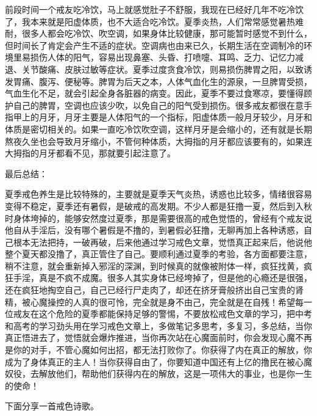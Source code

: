 前段时间一个戒友吃冷饮，马上就感觉肚子不舒服，我现在已经好几年不吃冷饮了，我本来就是阳虚体质，也不大适合吃冷饮。夏季炎热，人们常常感觉暑热难耐，很多人都会吃冷饮、吹空调，如果身体比较健康，那可能暂时感觉不到什么，但时间长了肯定会产生不适的症状。空调病也由来已久，长期生活在空调制冷的环境里易损伤人体的阳气，容易出现鼻塞、头昏、打喷嚏、耳鸣、乏力、记忆力减退、关节酸痛、皮肤过敏等症状。夏季过度贪食冷饮，则易损伤脾胃之阳，以致诱发胃痛、腹泻、便秘等。脾胃为后天之本，人体气血化生的源泉，一旦脾胃受损，气血生化不足，就会引起全身各脏器的病变。因此，夏季不要过食寒凉，要懂得顾护自己的脾胃，空调也应该少吹，以免自己的阳气受到损伤。很多戒友都很在意手指甲上的月牙，月牙主要是人体阳气的一个指标，阳虚体质一般月牙较少，月牙和体质是密切相关的。如果一直吃冷饮吹空调，这样月牙是会缩小的，还有就是长期熬夜久坐也会导致月牙缩小，不管何种体质，大拇指的月牙都应该要有的，如果连大拇指的月牙都看不见，那就要引起注意了。

最后总结：

夏季戒色养生是比较特殊的，主要就是夏季天气炎热，诱惑也比较多，情绪很容易变得不稳定，夏季还有暑假，是破戒的高发期。不少人都是狂撸一夏，然后到入秋时身体垮掉的，能够安然度过夏季，那是需要很高的戒色觉悟的，曾经有个戒友说他自从手淫后，没有哪个暑假是不撸的，到暑假必狂撸，无聊再加上各种诱惑，自己根本无法把持，一破再破，后来他通过学习戒色文章，觉悟真正起来后，他说他整个夏天都没撸了，真正管住了自己。要顺利通过夏季的考验，各方面都要注意，稍不注意，就会重新掉入邪淫的深渊，到时候真的就像被附体一样，疯狂找黄，疯狂手淫，真是不疯不成魔。很多人其实身体已经垮掉了，但是他的心瘾还是很强，还在疯狂地掏空自己，自己已经行尸走肉了，却还在挤牙膏般挤出自己宝贵的肾精，被心魔操控的人真的很可怜，完全就是身不由己，完全就是在自残！希望每一位戒友在这个危险的夏季都能保持足够的警惕，不要放松戒色文章的学习，把中考和高考的学习劲头用在学习戒色文章上，多做笔记多思考，多复习，多总结，当你真正悟进去了，觉悟就会爆炸推进，当你再次站在心魔面前时，你会发现心魔不再是你的对手，不管心魔如何出招，都无法打败你了。你获得了内在真正的解放，你成为了身体真正的主人！当你获得自由了，你要知道中国还有上亿的撸民在被心魔奴役，去解放他们，帮助他们获得内在的解放，这是一项伟大的事业，也是你一生的使命！

下面分享一首戒色诗歌。

